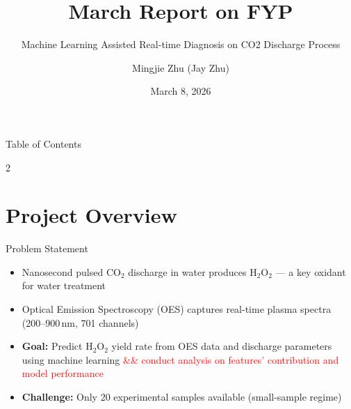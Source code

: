 \documentclass{libs/XJTLU_format}
\title[University of Liverpool Beamer Template]{\huge\textbf{March Report on FYP}}
\subtitle{Machine Learning Assisted Real-time Diagnosis on CO2 Discharge Process}
\author{Mingjie Zhu (Jay Zhu)}
\institute[University of Liverpool]{
    \normalsize{\email{sgmzhu11@liverpool.ac.uk}}
    \newline
    \university{University of Liverpool}
}
\date{March 8, 2026}
\begin{document}


\begin{frame}{}
    \maketitle
\end{frame}

\begin{frame}{Table of Contents}
    \begin{multicols}{2}
        \tableofcontents
    \end{multicols}
\end{frame}


\section{Project Overview}

\begin{frame}{Problem Statement}
    \begin{itemize}
        \item Nanosecond pulsed CO$_2$ discharge in water produces H$_2$O$_2$ --- a key oxidant for water treatment
        \item Optical Emission Spectroscopy (OES) captures real-time plasma spectra (200--900\,nm, 701 channels)
        \item \textbf{Goal:} Predict H$_2$O$_2$ yield rate from OES data and discharge parameters using machine learning 
        \textcolor{red}{\&\& conduct analysis on features' contribution and model performance}
        \item \textbf{Challenge:} Only 20 experimental samples available (small-sample regime)
    \end{itemize}
\end{frame}
\end{document}
